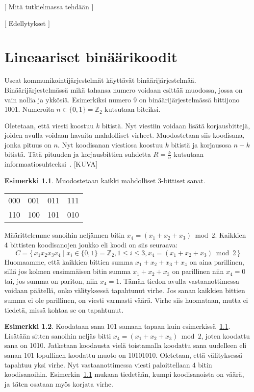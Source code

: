 \documentclass[a4paper,12pt,leqno,oneside]{report} %
\theoremstyle{plain}
\theoremstyle{definition}
\newtheorem{esimerkki}{Esimerkki}[chapter]
\theoremstyle{remark}
\numberwithin{equation}{chapter}
\newcommand*{\Zset}{\mathbb{Z}}  %
\begin{document}
    [ Mitä tutkielmassa tehdään ]


    [ Edellytykset ]

    \chapter{Lineaariset binäärikoodit}\label{ch: Lineaariset binäärikoodit}

    Useat kommunikointijärjestelmät käyttävät binäärijärjestelmää. Binäärijärjestelmässä mikä tahansa numero voidaan esittää muodossa, jossa on vain nollia ja ykkösiä. Esimerkiksi numero 9 on binäärijärjestelmässä bittijono 1001. Numeroita
    $n \in \{ 0, 1 \} = \Zset_2$ kutsutaan biteiksi.

    Oletetaan, että viesti koostuu $k$ bitistä. Nyt viestiin voidaan lisätä korjausbittejä, joiden avulla voidaan havaita mahdolliset virheet. Muodostetaan siis koodisana, jonka pituus on $n$. Nyt koodisanan viestiosa koostuu $k$ bitistä ja korjausosa $n-k$ bitistä. Tätä pituuden ja korjausbittien suhdetta $R = \frac{k}{n}$ kutsutaan informaatiosuhteeksi~\cite[s.~267]{GW}.
    [KUVA]
    \begin{esimerkki}\label{esim:3bitsanat}
        Muodostetaan kaikki mahdolliset 3-bittiset sanat.
        \begin{center}
            \begin{tabular}[t]{llll}
                000 & 001 & 011 & 111 \\
                110 & 100 & 101 & 010 \\
            \end{tabular}
        \end{center}
        Määrittelemme sanoihin neljännen bitin
        $x_4 = (x_1 + x_2 + x_3) \bmod2$. Kaikkien 4 bittisten koodisanojen joukko eli koodi on siis seuraava:
        \[
            C = \{\, x_1x_2x_3x_4 \mid  x_i \in \{0,1\} = \Zset_2, 1 \le i \le 3, x_4 = (x_1 + x_2 + x_3) \bmod2\,\}
        \]
        Huomaamme, että kaikkien bittien summa $x_1 + x_2 + x_3 + x_4$ on aina parillinen, sillä jos kolmen ensimmäisen bitin summa $x_1 + x_2 + x_3$ on parillinen niin $x_4 = 0$ tai, jos summa on pariton, niin $x_4 = 1$.
        Tämän tiedon avulla vastaanottimessa voidaan päätellä, onko välityksessä tapahtunut virhe. Jos sanan kaikkien bittien summa ei ole parillinen, on viesti varmasti väärä. Virhe siis huomataan, mutta ei tiedetä, missä kohtaa se on tapahtunut.
    \end{esimerkki}
    \begin{esimerkki}\label{esim:3bitsanatjatko}
        Koodataan sana 101 samaan tapaan kuin
        esimerkissä~\ref{esim:3bitsanat}. Lisätään sitten sanoihin neljäs bitti $x_4 = (x_1 + x_2 + x_3) \bmod2$, joten koodattu sana on 1010. Jatketaan koodausta vielä toistamalla koodattu sana uudelleen eli sanan 101 lopullinen koodattu muoto on 10101010. Oletetaan, että välityksessä tapahtuu yksi virhe. Nyt vastaanottimessa viesti paloittellaan 4 bitin koodisanoihin. Esimerkin~\ref{esim:3bitsanat} mukaan tiedetään, kumpi koodisanoista on väärä, ja täten osataan myös korjata virhe.
    \end{esimerkki}
\end{document}
